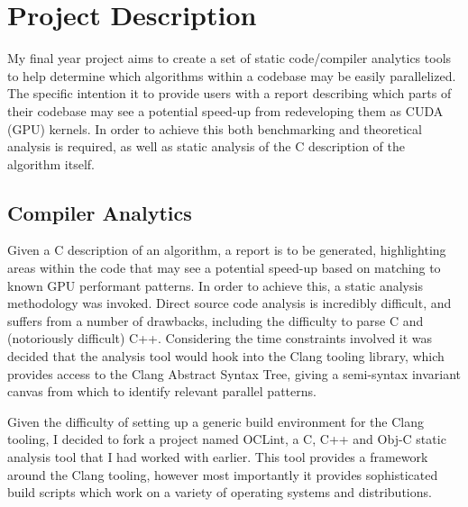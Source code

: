 
\section{Project Description}
My final year project aims to create a set of static code/compiler analytics tools to help determine which algorithms within a codebase may be easily parallelized. The specific intention it to provide users with a report describing which parts of their codebase may see a potential speed-up from redeveloping them as CUDA (GPU) kernels. In order to achieve this both benchmarking and theoretical analysis is required, as well as static analysis of the C description of the algorithm itself.

\subsection{Compiler Analytics}
Given a C description of an algorithm, a report is to be generated, highlighting areas within the code that may see a potential speed-up based on matching to known GPU performant patterns. In order to achieve this, a static analysis methodology was invoked. Direct source code analysis is incredibly difficult, and suffers from a number of drawbacks, including the difficulty to parse C and (notoriously difficult) C++. Considering the time constraints involved it was decided that the analysis tool would hook into the Clang tooling library, which provides access to the Clang Abstract Syntax Tree, giving a semi-syntax invariant canvas from which to identify relevant parallel patterns.

Given the difficulty of setting up a generic build environment for the Clang tooling, I decided to fork a project named OCLint, a C, C++ and Obj-C static analysis tool that I had worked with earlier. This tool provides a framework around the Clang tooling, however most importantly it provides sophisticated build scripts which work on a variety of operating systems and distributions.

